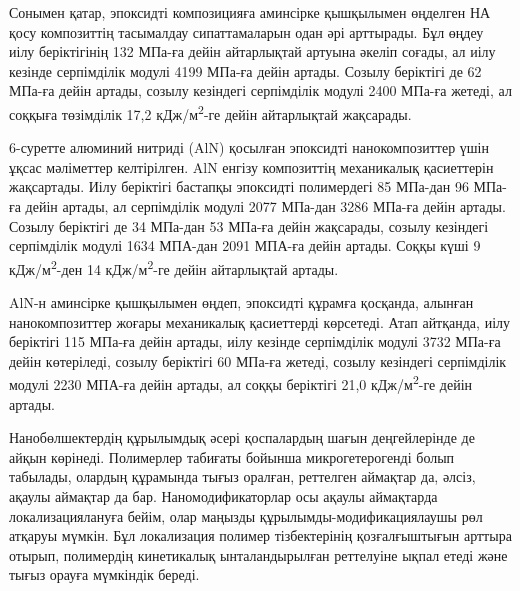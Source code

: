 \begin{multicols}{2}
Сонымен қатар, эпоксидті композицияға аминсірке қышқылымен өңделген НА
қосу композиттің тасымалдау сипаттамаларын одан әрі арттырады. Бұл өңдеу
иілу беріктігінің 132 МПа-ға дейін айтарлықтай артуына әкеліп соғады, ал
иілу кезінде серпімділік модулі 4199 МПа-ға дейін артады. Созылу
беріктігі де 62 МПа-ға дейін артады, созылу кезіндегі серпімділік модулі
2400 МПа-ға жетеді, ал соққыға төзімділік 17,2
кДж/м\textsuperscript{2}-ге дейін айтарлықтай жақсарады.

6-суретте алюминий нитриді (AlN) қосылған эпоксидті нанокомпозиттер үшін
ұқсас мәліметтер келтірілген. AlN енгізу композиттің механикалық
қасиеттерін жақсартады. Иілу беріктігі бастапқы эпоксидті полимердегі 85
МПа-дан 96 МПа-ға дейін артады, ал серпімділік модулі 2077 МПа-дан 3286
МПа-ға дейін артады. Созылу беріктігі де 34 МПа-дан 53 МПа-ға дейін
жақсарады, созылу кезіндегі серпімділік модулі 1634 МПА-дан 2091 МПА-ға
дейін артады. Соққы күші 9 кДж/м\textsuperscript{2}-ден 14
кДж/м\textsuperscript{2}-ге дейін айтарлықтай артады.

AlN-н аминсірке қышқылымен өңдеп, эпоксидті құрамға қосқанда, алынған
нанокомпозиттер жоғары механикалық қасиеттерді көрсетеді. Атап айтқанда,
иілу беріктігі 115 МПа-ға дейін артады, иілу кезінде серпімділік модулі
3732 МПа-ға дейін көтеріледі, созылу беріктігі 60 МПа-ға жетеді, созылу
кезіндегі серпімділік модулі 2230 МПА-ға дейін артады, ал соққы
беріктігі 21,0 кДж/м\textsuperscript{2}-ге дейін артады.

Нанобөлшектердің құрылымдық әсері қоспалардың шағын деңгейлерінде де
айқын көрінеді. Полимерлер табиғаты бойынша микрогетерогенді болып
табылады, олардың құрамында тығыз оралған, реттелген аймақтар да, әлсіз,
ақаулы аймақтар да бар. Наномодификаторлар осы ақаулы аймақтарда
локализациялануға бейім, олар маңызды құрылымды-модификациялаушы рөл
атқаруы мүмкін. Бұл локализация полимер тізбектерінің қозғалғыштығын
арттыра отырып, полимердің кинетикалық ынталандырылған реттелуіне ықпал
етеді және тығыз орауға мүмкіндік береді.
\end{multicols}

